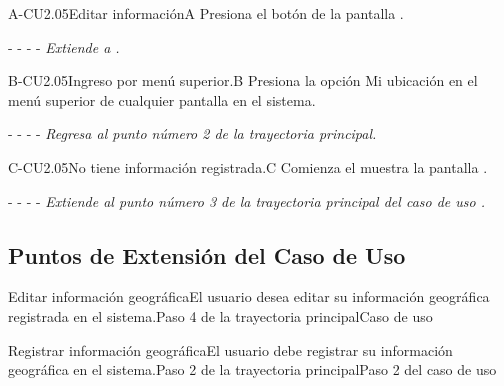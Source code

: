 	
	\begin{UCtrayectoriaA}{A-CU2.05}{Editar información}{A}
	    \UCpaso[\UCactor]Presiona el botón  de la pantalla .
	    \item[- -] - - {\em Extiende a .} 
	\end{UCtrayectoriaA}
	
	\begin{UCtrayectoriaA}{B-CU2.05}{Ingreso por menú superior.}{B}
	    \UCpaso[\UCactor]Presiona la opción Mi ubicación en el menú superior de cualquier pantalla en el sistema. %
	    \item[- -] - - {\em Regresa al punto número 2 de la trayectoria principal.}
	\end{UCtrayectoriaA}
	
	\begin{UCtrayectoriaA}{C-CU2.05}{No tiene información registrada.}{C}
	    \UCpaso[\UCsist] Comienza el muestra la pantalla . %
	    \item[- -] - - {\em Extiende al punto número 3 de la trayectoria principal del caso de uso .}
	\end{UCtrayectoriaA}
	
	\subsection{Puntos de Extensión del Caso de Uso}

	\begin{UCExtenssionPoint}{Editar información geográfica}{El usuario desea editar su información geográfica registrada en el sistema.}{Paso 4 de la trayectoria principal}{Caso de uso  } 
	\end{UCExtenssionPoint}
	
	\begin{UCExtenssionPoint}{Registrar información geográfica}{El usuario debe registrar su información geográfica en el sistema.}{Paso 2 de la trayectoria principal}{Paso 2 del caso de uso } 
	\end{UCExtenssionPoint}

